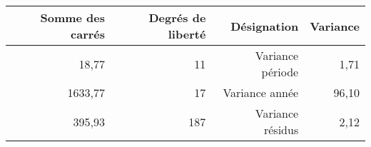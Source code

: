 \begin{tabular}{rrrr}
\toprule
    \textbf{Somme des carrés} & \textbf{Degrés de liberté} & \textbf{Désignation} & \textbf{Variance} \\
\midrule
    18,77 & 11 & Variance période &  1,71 \\ 
    1633,77 & 17  & Variance année & 96,10  \\ 
   395,93  & 187 & Variance résidus &  2,12 \\ 
\bottomrule 
\end{tabular}